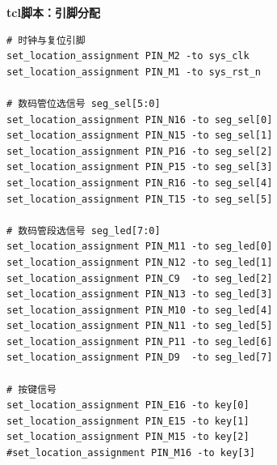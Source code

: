 \documentclass[UTF8]{article}
\theoremstyle{MyLineTheoremStyle} %
\theoremstyle{MyBlockTheoremStyle} %
\theoremstyle{MySubsubsectionStyle} %
\begin{document}
\cleardoublepage
\textbf{tcl脚本：引脚分配}
\begin{lstlisting}
# 时钟与复位引脚
set_location_assignment PIN_M2 -to sys_clk
set_location_assignment PIN_M1 -to sys_rst_n

# 数码管位选信号 seg_sel[5:0]
set_location_assignment PIN_N16 -to seg_sel[0]
set_location_assignment PIN_N15 -to seg_sel[1]
set_location_assignment PIN_P16 -to seg_sel[2]
set_location_assignment PIN_P15 -to seg_sel[3]
set_location_assignment PIN_R16 -to seg_sel[4]
set_location_assignment PIN_T15 -to seg_sel[5]

# 数码管段选信号 seg_led[7:0]
set_location_assignment PIN_M11 -to seg_led[0]
set_location_assignment PIN_N12 -to seg_led[1]
set_location_assignment PIN_C9  -to seg_led[2]
set_location_assignment PIN_N13 -to seg_led[3]
set_location_assignment PIN_M10 -to seg_led[4]
set_location_assignment PIN_N11 -to seg_led[5]
set_location_assignment PIN_P11 -to seg_led[6]
set_location_assignment PIN_D9  -to seg_led[7]

# 按键信号
set_location_assignment PIN_E16 -to key[0]
set_location_assignment PIN_E15 -to key[1]
set_location_assignment PIN_M15 -to key[2]
#set_location_assignment PIN_M16 -to key[3]
\end{lstlisting}
\end{document}
